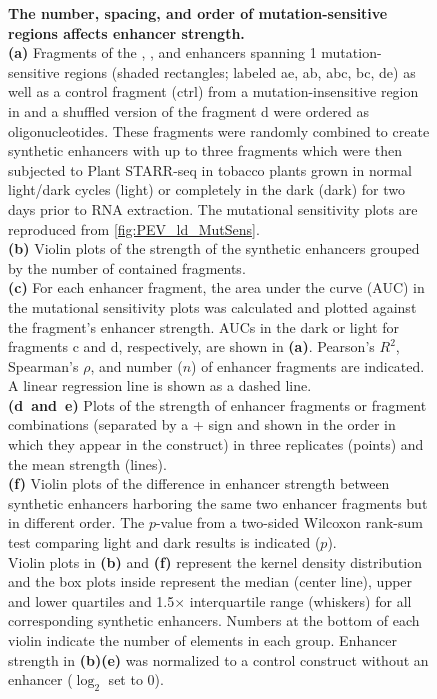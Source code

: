 \documentclass[10pt]{article}
\newcommand{\fignormal}{\footnotesize}
\newcommand{\light}{light}
\newcommand{\dark}{dark}
\newif\ifnpc
\newcounter{fig}
\newenvironment{fig}{%
	\begin{figure}[p]%
		\stepcounter{fig}%
		\pdfbookmark{\figurename\ \thefig}{figure\thefig}
		\tikzsetnextfilename{figure\thefig}%
		\fignormal%
		\centering%
}{%
	\end{figure}%
	\clearpage%
	\ifnpc%
		\makenextpagecaption%
		\global\npcfalse%
	\fi%
}
\newcommand{\titleend}{\\}
\newcommand{\nextentry}{\\}
\newcommand{\captiontitle}[2][]{\textbf{#2.}\titleend}
\newif\ifsubfigupper
\newcounter{subfig}[figure]
\newcommand{\subfigrefsep}{}
\newcommand{\subfigrefand}{~and~}
\newcommand{\subfigrefrange}{\textendash}
\newcommand{\subfigunformatted}[1]{\ifsubfigupper\uppercase{#1}\else\lowercase{#1}\fi}
\newcommand{\plainsubfigref}[1]{\textbf{\subfigunformatted{#1}}}
\newcommand{\subfig}[1]{\textbf{(\plainsubfigref{#1})}\subfigrefsep}
\newcommand{\subfigtwo}[2]{\textbf{(\plainsubfigref{#1}\subfigrefand\plainsubfigref{#2})}\subfigrefsep}
\newcommand{\parensubfig}[2][]{\textbf{(#1\plainsubfigref{#2})}}
\begin{document}
		\begin{fig}
			\caption{%
				\captiontitle{The number, spacing, and order of mutation-sensitive regions affects enhancer strength}%
				\subfig{A} Fragments of the , , and  enhancers spanning 1 mutation-sensitive regions (shaded rectangles; labeled a\textendash e, ab, abc, bc, de) as well as a control fragment (ctrl) from a mutation-insensitive region in  and a shuffled version of the  fragment d were ordered as oligonucleotides. These fragments were randomly combined to create synthetic enhancers with up to three fragments which were then subjected to Plant STARR-seq in tobacco plants grown in normal light/dark cycles (\light) or completely in the dark (\dark) for two days prior to RNA extraction. The mutational sensitivity plots are reproduced from \cref{fig:PEV_ld_MutSens}.\nextentry
				\subfig{B} Violin plots of the strength of the synthetic enhancers grouped by the number of contained fragments.\nextentry
				\subfig{C} For each enhancer fragment, the area under the curve (AUC) in the mutational sensitivity plots was calculated and plotted against the fragment's enhancer strength. AUCs in the \dark{} or \light{} for  fragments c and d, respectively, are shown in \parensubfig{A}. Pearson's $R^2$, Spearman's $\rho$, and number ($n$) of enhancer fragments are indicated. A linear regression line is shown as a dashed line.\nextentry
				\subfigtwo{D}{E} Plots of the strength of enhancer fragments or fragment combinations (separated by a + sign and shown in the order in which they appear in the construct) in three replicates (points) and the mean strength (lines).\nextentry
				\subfig{F} Violin plots of the difference in enhancer strength between synthetic enhancers harboring the same two enhancer fragments but in different order. The $p$-value from a two-sided Wilcoxon rank-sum test comparing light and dark results is indicated ($p$).\nextentry
				Violin plots in \parensubfig{B} and \parensubfig{F} represent the kernel density distribution and the box plots inside represent the median (center line), upper and lower quartiles and 1.5$\times$ interquartile range (whiskers) for all corresponding synthetic enhancers. Numbers at the bottom of each violin indicate the number of elements in each group.
				Enhancer strength in \parensubfig{B}\subfigrefrange\parensubfig{E} was normalized to a control construct without an enhancer ($\log_2$ set to 0).
			}%
			\label{fig:PEF_cooperativity}
		\end{fig}
		
\end{document}
